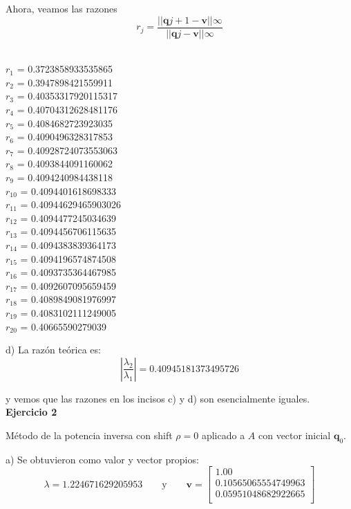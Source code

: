 \documentclass[11pt]{article}
\begin{document}
Ahora, veamos las razones
$$
r_j = \frac{||\textbf{q}{j+1} - \textbf{v}||\infty}{||\textbf{q}{j} - \textbf{v}||\infty}
$$
\\

\begin{multicols}{3}
\noindent
$r_1$ = 0.3723858933535865 \\
$r_2$ = 0.3947898421559911 \\
$r_3$ = 0.40353317920115317 \\
$r_4$ = 0.40704312628481176 \\
$r_5$ = 0.4084682723923035 \\
$r_6$ = 0.4090496328317853 \\
$r_7$ = 0.40928724073553063 \\
$r_8$ = 0.4093844091160062 \\
$r_9$ = 0.4094240984438118 \\
$r_{10}$ = 0.4094401618698333 \\
$r_{11}$ = 0.40944629465903026 \\
$r_{12}$ = 0.4094477245034639 \\
$r_{13}$ = 0.4094456706115635 \\
$r_{14}$ = 0.4094383839364173 \\
$r_{15}$ = 0.4094196574874508 \\
$r_{16}$ = 0.4093735364467985 \\
$r_{17}$ = 0.4092607095659459 \\
$r_{18}$ = 0.4089849081976997 \\
$r_{19}$ = 0.4083102111249005 \\
$r_{20}$ = 0.40665590279039 \\
\end{multicols}



d) La razón teórica es:
$$
\left| \frac{\lambda_2}{\lambda_1} \right| = 0.40945181373495726
$$

y vemos que las razones en los incisos c) y d) son esencialmente iguales.
\\

\noindent
\textbf{Ejercicio 2}

\noindent
Método de la potencia inversa con shift $\rho = 0$ aplicado a $A$ con vector inicial $\textbf{q}_0$.

a) Se obtuvieron como valor y vector propios:
 \[
 \lambda = 1.224671629205953
 \qquad\text{y}\qquad
 \textbf{v} = \begin{bmatrix}
1.00 \\
0.10565065554749963 \\
0.05951048682922665 \\
\end{bmatrix}
 \]
 \\
 \\
\end{document}
